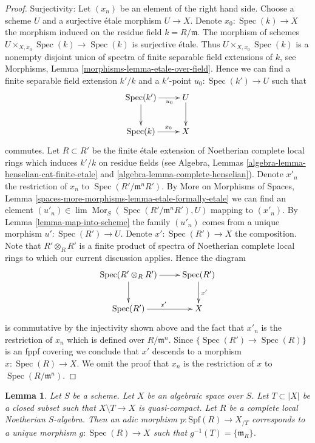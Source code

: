 \documentclass{stacks-project}
\theoremstyle{plain}
\newtheorem{lemma}[subsection]{Lemma}
\theoremstyle{definition}
\theoremstyle{remark}
\numberwithin{equation}{subsection}
\def\lim{\mathop{\mathrm{lim}}\nolimits}
\def\Spec{\mathop{\mathrm{Spec}}}
\def\Mor{\mathop{\mathrm{Mor}}\nolimits}
\begin{document}
\begin{proof}
\medskip\noindent
Surjectivity: Let $(x_n)$ be an element of the right hand side.
Choose a scheme $U$ and a surjective \'etale morphism $U \to X$. 
Denote $x_0 : \Spec(k) \to X$ the morphism induced on the residue field
$k = R/\mathfrak m$. The morphism of schemes
$U \times_{X, x_0} \Spec(k) \to \Spec(k)$ is surjective \'etale.
Thus $U \times_{X, x_0} \Spec(k)$ is a nonempty disjoint union of spectra
of finite separable field extensions of $k$, see
Morphisms, Lemma \ref{morphisms-lemma-etale-over-field}.
Hence we can find a finite separable field extension $k'/k$
and a $k'$-point $u_0 : \Spec(k') \to U$ such that
$$
\xymatrix{
\Spec(k') \ar[d] \ar[r]_-{u_0} & U \ar[d] \\
\Spec(k) \ar[r]^-{x_0} & X
}
$$
commutes. Let $R \subset R'$ be the finite \'etale extension of Noetherian
complete local rings which induces $k'/k$ on residue fields
(see Algebra, Lemmas \ref{algebra-lemma-henselian-cat-finite-etale} and
\ref{algebra-lemma-complete-henselian}). Denote $x'_n$ the restriction
of $x_n$ to $\Spec(R'/\mathfrak m^nR')$. By
More on Morphisms of Spaces, Lemma
\ref{spaces-more-morphisms-lemma-etale-formally-etale}
we can find an element
$(u'_n) \in \lim \Mor_S(\Spec(R'/\mathfrak m^nR'), U)$
mapping to $(x'_n)$. By Lemma \ref{lemma-map-into-scheme}
the family $(u'_n)$ comes from a unique
morphism $u' : \Spec(R') \to U$. Denote $x' : \Spec(R') \to X$ the
composition. Note that $R' \otimes_R R'$ is a finite product of spectra of
Noetherian complete local rings to which our current discussion applies.
Hence the diagram
$$
\xymatrix{
\Spec(R' \otimes_R R') \ar[r] \ar[d] & \Spec(R') \ar[d]^{x'} \\
\Spec(R') \ar[r]^{x'} & X
}
$$
is commutative by the injectivity shown above and the fact that
$x'_n$ is the restriction of $x_n$ which is defined over $R/\mathfrak m^n$.
Since $\{\Spec(R') \to \Spec(R)\}$ is an fppf covering we conclude
that $x'$ descends to a morphism $x : \Spec(R) \to X$.
We omit the proof that $x_n$ is the restriction of $x$ to
$\Spec(R/\mathfrak m^n)$.
\end{proof}

\begin{lemma}
\label{lemma-adic-into-completion}
Let $S$ be a scheme. Let $X$ be an algebraic space over $S$.
Let $T \subset |X|$ be a closed subset such that
$X \setminus T \to X$ is quasi-compact. Let $R$ be a complete local
Noetherian $S$-algebra. Then an adic morphism $p : \text{Spf}(R) \to X_{/T}$
corresponds to a unique morphism $g : \Spec(R) \to X$ such
that $g^{-1}(T) = \{\mathfrak m_R\}$. 
\end{lemma}
\end{document}
